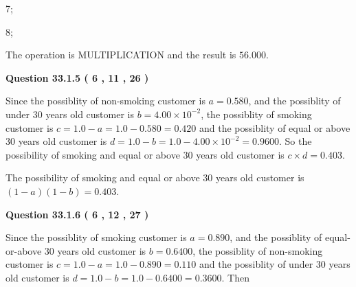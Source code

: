 \documentclass[12pt]{article}
\begin{document}
  
 
 
\noindent{}

7;
 
8;
 
The operation is  %
MULTIPLICATION and the result is
$ %
56.000$.
 
 
 
  
\vspace{0.2in}
  
{\textbf{\Large{Question
33.1.5 
 (           6 ,          11 ,          26 )
}}}
  
  
 
 
\noindent{}

Since the possiblity of  %
 non-smoking customer is $ a =  %
0.580 $,
and the possiblity of  %
 under 30 years old customer is $ b =  %
4.00 \times 10^{-2} $,
the possiblity of  %
smoking customer is $ c = 1.0 - a = 1.0 -
0.580
=  %
0.420 $ and the possiblity of  %
equal or above 30 years old
customer is $ d = 1.0 - b = 1.0 -  %
4.00 \times 10^{-2} =  %
0.9600  $.
So the possibility of  %
smoking and  %
equal or above 30 years old
customer is $ c \times d =  %
0.403 $.
 
 
 
 
 
\noindent{}

The possibility of  %
smoking and  %
equal or above 30 years old
customer is $ (1-a)(1-b) =  %
0.403 $.
 
 
  
\vspace{0.2in}
  
{\textbf{\Large{Question
33.1.6 
 (           6 ,          12 ,          27 )
}}}
  
  
 
 
\noindent{}

Since the possiblity of  %
smoking customer is $ a =  %
0.890 $,
and the possiblity of  %
equal-or-above 30 years old customer is $ b =  %
0.6400 $,
the possiblity of  %
non-smoking customer is $ c = 1.0 - a = 1.0 -
0.890
=  %
0.110 $ and the possiblity of  %
under 30 years old
customer is $ d = 1.0 - b = 1.0 -  %
0.6400 =  %
0.3600  $.
Then
 
\end{document}

